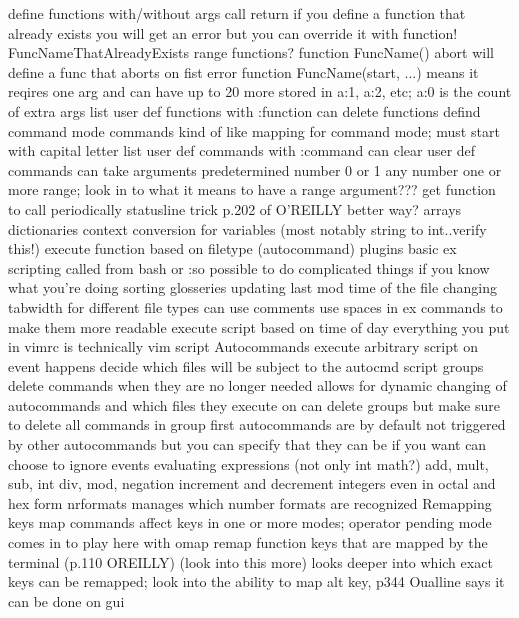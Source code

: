 \documentclass[12pt]{book}
\begin{document}
{{    define functions
      with/without args
      call
      return
      if you define a function that already exists you will get an error but you can override it with function! FuncNameThatAlreadyExists
      range functions?
      function FuncName() abort will define a func that aborts on fist error
      function FuncName(start, ...) means it reqires one arg and can have up to 20 more stored in a:1, a:2, etc; a:0 is the count of extra args
      list user def functions with :function
      can delete functions
    defind command mode commands
      kind of like mapping for command mode; must start with capital letter
      list user def commands with :command
      can clear user def commands
      can take arguments
        predetermined number
        0 or 1
        any number
        one or more
        range; look in to what it means to have a range argument???
    get function to call periodically
      statusline trick p.202 of O'REILLY
      better way?
    arrays
    dictionaries
    context conversion for variables (most notably string to int..verify this!)
    execute function based on filetype (autocommand)
    plugins
    basic ex scripting called from bash or :so
      possible to do complicated things if you know what you're doing
        sorting glosseries
        updating last mod time of the file
        changing tabwidth for different file types
      can use comments
      use spaces in ex commands to make them more readable
    execute script based on time of day
    everything you put in vimrc is technically vim script
    Autocommands
      execute arbitrary script on event happens
      decide which files will be subject to the autocmd script
      groups
      delete commands when they are no longer needed
        allows for dynamic changing of autocommands and which files they execute on
      can delete groups but make sure to delete all commands in group first
      autocommands are by default not triggered by other autocommands but you can specify that they can be if you want
      can choose to ignore events
    evaluating expressions (not only int math?)
      add, mult, sub, int div, mod, negation
    increment and decrement integers even in octal and hex form
      nrformats manages which number formats are recognized
  Remapping keys
    map commands affect keys in one or more modes; operator pending mode comes in to play here with omap
    remap function keys that are mapped by the terminal (p.110 OREILLY) (look into this more)
      looks deeper into which exact keys can be remapped; look into the ability to map alt key, p344 Oualline says it can be done on gui
}}
\end{document}

